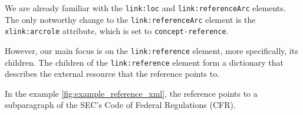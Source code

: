 We are already familiar with the \texttt{link:loc} and \texttt{link:referenceArc} elements. 
The only notworthy change to the \texttt{link:referenceArc} element is the \texttt{xlink:arcrole} attribute, which is set to \texttt{concept-reference}.

However, our main focus is on the \texttt{link:reference} element, more specifically, its children.
The children of the \texttt{link:reference} element form a dictionary that describes the external resource that the reference points to.

In the example \ref{fig:example_reference_xml}, the reference points to a subparagraph of the SEC's Code of Federal Regulations (CFR).